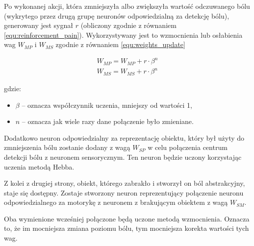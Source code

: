Po wykonanej akcji, która zmniejszyła albo zwiększyła wartość odczuwanego bólu 
(wykrytego przez drugą grupę neuronów odpowiedzialną za detekcję bólu), 
generowany jest sygnał $r$ (obliczony zgodnie z równaniem 
\ref{equ:reinforcement_pain}). Wykorzystywany jest to wzmocnienia lub 
osłabienia wag $W_{MP}$ i $W_{MS}$ zgodnie z równaniem \ref{equ:weights_update}

\begin{equation}
	\label{equ:weights_update}
	\begin{aligned}
		W_{MP} = W_{MP} + r \cdot \beta ^ n \\
		W_{MS} = W_{MS} + r \cdot \beta ^ n
	\end{aligned}
\end{equation}

gdzie:
\begin{itemize}
	\item $\beta$ -- oznacza współczynnik uczenia, mniejszy od wartości 1,
	\item $n$ -- oznacza jak wiele razy dane połączenie było zmieniane.
\end{itemize}

Dodatkowo neuron odpowiedzialny za reprezentację obiektu, który był użyty do 
zmniejszenia bólu zostanie dodany z wagą $W_{SP}$ w celu połączenia centrum 
detekcji bólu z neuronem sensorycznym. Ten neuron będzie uczony korzystając 
uczenia metodą Hebba.

Z kolei z drugiej strony, obiekt, którego zabrakło i stworzył on ból 
abstrakcyjny, staje się dostępny. Zostaje stworzony neuron reprezentujący 
połączenie neuronu odpowiedzialnego za motorykę z neuronem z brakującym 
obiektem z wagą $W_{SM}$.

Oba wymienione wcześniej połączone będą uczone metodą wzmocnienia. Oznacza to, 
że im mocniejsza zmiana poziomu bólu, tym mocniejsza korekta wartości tych wag. 



